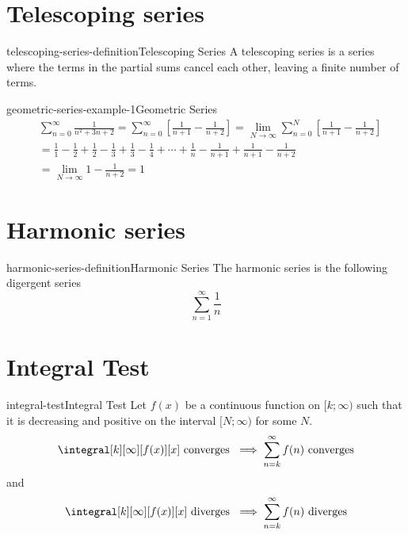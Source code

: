 \documentclass[preview]{standalone}
\begin{document}
\section{Telescoping series}

\begin{snippetdefinition}{telescoping-series-definition}{Telescoping Series}
    A telescoping series is a series where the terms in the partial sums cancel each other,
    leaving a finite number of terms.
\end{snippetdefinition}

\begin{snippetexample}{geometric-series-example-1}{Geometric Series}
    \begin{align*}
        &\sum_{n=0}^\infty \frac{1}{n^2 + 3n + 2}
        = \sum_{n=0}^\infty \left[ \frac{1}{n+1} - \frac{1}{n+2} \right]
        = \lim_{N \to \infty} \sum_{n=0}^N \left[ \frac{1}{n+1} - \frac{1}{n+2} \right] \\
        &= \frac{1}{1} - \frac{1}{2} + \frac{1}{2} - \frac{1}{3}
        + \frac{1}{3} - \frac{1}{4} + \cdots + \frac{1}{n} - \frac{1}{n+1} +
        \frac{1}{n+1} - \frac{1}{n+2} \\
        &= \lim_{N \to \infty} 1 - \frac{1}{n+2} = 1
    \end{align*}
\end{snippetexample}

\section{Harmonic series}

\begin{snippetdefinition}{harmonic-series-definition}{Harmonic Series}
    The harmonic series is the following digergent series
    \[
        \sum_{n=1}^\infty \frac{1}{n}
    \]
\end{snippetdefinition}

\section{Integral Test}

\begin{snippetdefinition}{integral-test}{Integral Test}
    Let \(f(x)\) be a continuous function on \([k;\infty)\)
    such that it is decreasing and positive on the interval \([N; \infty)\)
    for some \(N\).
    \[
        \integral[k][\infty][f(x)][x] \text{ converges } \implies
        \sum_{n=k}^{\infty} f(n) \text{ converges}
    \]
    and
    \[
        \integral[k][\infty][f(x)][x] \text{ diverges } \implies
        \sum_{n=k}^{\infty} f(n) \text{ diverges}
    \]
\end{snippetdefinition}
\end{document}
